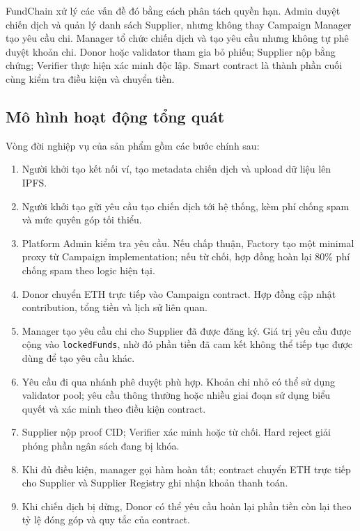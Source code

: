 FundChain xử lý các vấn đề đó bằng cách phân tách quyền hạn. Admin duyệt chiến dịch và quản lý danh sách Supplier, nhưng không thay Campaign Manager tạo yêu cầu chi. Manager tổ chức chiến dịch và tạo yêu cầu nhưng không tự phê duyệt khoản chi. Donor hoặc validator tham gia bỏ phiếu; Supplier nộp bằng chứng; Verifier thực hiện xác minh độc lập. Smart contract là thành phần cuối cùng kiểm tra điều kiện và chuyển tiền.

\subsection{Mô hình hoạt động tổng quát}

Vòng đời nghiệp vụ của sản phẩm gồm các bước chính sau:

\begin{enumerate}
  \item Người khởi tạo kết nối ví, tạo metadata chiến dịch và upload dữ liệu lên IPFS.
  \item Người khởi tạo gửi yêu cầu tạo chiến dịch tới hệ thống, kèm phí chống spam và mức quyên góp tối thiểu.
  \item Platform Admin kiểm tra yêu cầu. Nếu chấp thuận, Factory tạo một minimal proxy từ Campaign implementation; nếu từ chối, hợp đồng hoàn lại 80\% phí chống spam theo logic hiện tại.
  \item Donor chuyển ETH trực tiếp vào Campaign contract. Hợp đồng cập nhật contribution, tổng tiền và lịch sử liên quan.
  \item Manager tạo yêu cầu chi cho Supplier đã được đăng ký. Giá trị yêu cầu được cộng vào \texttt{lockedFunds}, nhờ đó phần tiền đã cam kết không thể tiếp tục được dùng để tạo yêu cầu khác.
  \item Yêu cầu đi qua nhánh phê duyệt phù hợp. Khoản chi nhỏ có thể sử dụng validator pool; yêu cầu thông thường hoặc nhiều giai đoạn sử dụng biểu quyết và xác minh theo điều kiện contract.
  \item Supplier nộp proof CID; Verifier xác minh hoặc từ chối. Hard reject giải phóng phần ngân sách đang bị khóa.
  \item Khi đủ điều kiện, manager gọi hàm hoàn tất; contract chuyển ETH trực tiếp cho Supplier và Supplier Registry ghi nhận khoản thanh toán.
  \item Khi chiến dịch bị dừng, Donor có thể yêu cầu hoàn lại phần tiền còn lại theo tỷ lệ đóng góp và quy tắc của contract.
\end{enumerate}


